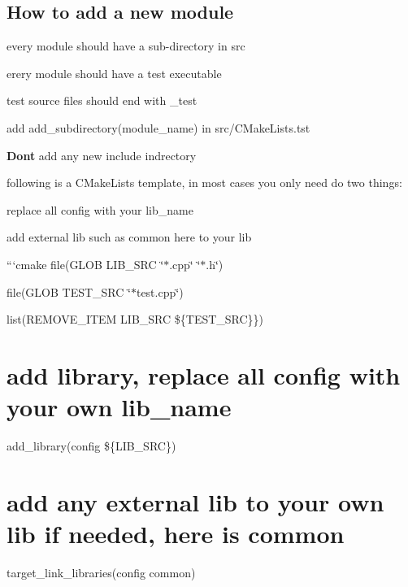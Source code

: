 \subsection*{How to add a new module}


\begin{DoxyItemize}
\item every module should have a sub-\/directory in {\ttfamily src}
\item erery module should have a test executable
\item test source files should end with {\ttfamily \+\_\+test}
\item add {\ttfamily add\+\_\+subdirectory(module\+\_\+name)} in {\ttfamily src/\+C\+Make\+Lists.\+tst}
\item {\bfseries Don\textquotesingle{}t} add any new include indrectory
\item following is a {\ttfamily C\+Make\+Lists} template, in most cases you only need do two things\+:
\begin{DoxyEnumerate}
\item replace all {\ttfamily config} with your {\ttfamily lib\+\_\+name}
\item add external lib such as {\ttfamily common} here to your lib
\end{DoxyEnumerate}
\end{DoxyItemize}

```cmake file(G\+L\+OB L\+I\+B\+\_\+\+S\+RC \char`\"{}$\ast$.\+cpp\char`\"{} \char`\"{}$\ast$.\+h\char`\"{})

file(G\+L\+OB T\+E\+S\+T\+\_\+\+S\+RC \char`\"{}$\ast$test.\+cpp\char`\"{})

list(R\+E\+M\+O\+V\+E\+\_\+\+I\+T\+EM L\+I\+B\+\_\+\+S\+RC \$\{T\+E\+S\+T\+\_\+\+S\+RC\}\})

\section*{add library, replace all {\ttfamily config} with your own {\ttfamily lib\+\_\+name}}

add\+\_\+library(config \$\{L\+I\+B\+\_\+\+S\+RC\})

\section*{add any external lib to your own lib if needed, here is {\ttfamily common}}

target\+\_\+link\+\_\+libraries(config common)

